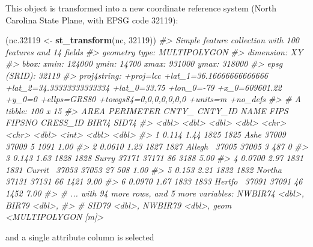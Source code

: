 \documentclass[]{krantz}
\newenvironment{Shaded}{\begin{snugshade}}{\end{snugshade}}
\newcommand{\KeywordTok}[1]{\textcolor[rgb]{0.13,0.29,0.53}{\textbf{#1}}}
\newcommand{\DecValTok}[1]{\textcolor[rgb]{0.00,0.00,0.81}{#1}}
\newcommand{\FloatTok}[1]{\textcolor[rgb]{0.00,0.00,0.81}{#1}}
\newcommand{\StringTok}[1]{\textcolor[rgb]{0.31,0.60,0.02}{#1}}
\newcommand{\CommentTok}[1]{\textcolor[rgb]{0.56,0.35,0.01}{\textit{#1}}}
\newcommand{\NormalTok}[1]{#1}
\theoremstyle{definition}
\theoremstyle{definition}
\theoremstyle{definition}
\theoremstyle{remark}
\begin{document}
This object is transformed into a new coordinate reference system (North
Carolina State Plane, with EPSG code 32119):

\begin{Shaded}
\begin{Highlighting}[]
\NormalTok{(nc}\FloatTok{.32119}\NormalTok{ <-}\StringTok{ }\KeywordTok{st_transform}\NormalTok{(nc, }\DecValTok{32119}\NormalTok{))}
\CommentTok{#> Simple feature collection with 100 features and 14 fields}
\CommentTok{#> geometry type:  MULTIPOLYGON}
\CommentTok{#> dimension:      XY}
\CommentTok{#> bbox:           xmin: 124000 ymin: 14700 xmax: 931000 ymax: 318000}
\CommentTok{#> epsg (SRID):    32119}
\CommentTok{#> proj4string:    +proj=lcc +lat_1=36.16666666666666 +lat_2=34.33333333333334 +lat_0=33.75 +lon_0=-79 +x_0=609601.22 +y_0=0 +ellps=GRS80 +towgs84=0,0,0,0,0,0,0 +units=m +no_defs}
\CommentTok{#> # A tibble: 100 x 15}
\CommentTok{#>     AREA PERIMETER CNTY_ CNTY_ID NAME    FIPS  FIPSNO CRESS_ID BIR74 SID74}
\CommentTok{#>    <dbl>     <dbl> <dbl>   <dbl> <chr>   <chr>  <dbl>    <int> <dbl> <dbl>}
\CommentTok{#> 1 0.114       1.44  1825    1825 Ashe    37009  37009        5  1091  1.00}
\CommentTok{#> 2 0.0610      1.23  1827    1827 Allegh~ 37005  37005        3   487  0   }
\CommentTok{#> 3 0.143       1.63  1828    1828 Surry   37171  37171       86  3188  5.00}
\CommentTok{#> 4 0.0700      2.97  1831    1831 Currit~ 37053  37053       27   508  1.00}
\CommentTok{#> 5 0.153       2.21  1832    1832 Northa~ 37131  37131       66  1421  9.00}
\CommentTok{#> 6 0.0970      1.67  1833    1833 Hertfo~ 37091  37091       46  1452  7.00}
\CommentTok{#> # ... with 94 more rows, and 5 more variables: NWBIR74 <dbl>, BIR79 <dbl>,}
\CommentTok{#> #   SID79 <dbl>, NWBIR79 <dbl>, geom <MULTIPOLYGON [m]>}
\end{Highlighting}
\end{Shaded}

and a single attribute column is selected
\end{document}
